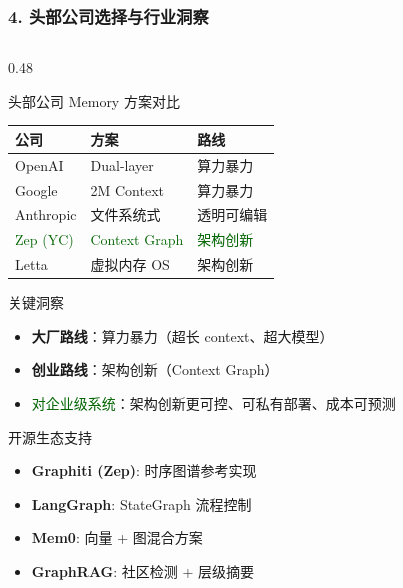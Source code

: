 \documentclass[aspectratio=169,10pt]{beamer}
\begin{document}
\begin{frame}
  \frametitle{4. 头部公司选择与行业洞察}

  \begin{columns}[T]
    \begin{column}{0.48\textwidth}
      \begin{block}{头部公司 Memory 方案对比}
        \scriptsize
        \begin{tabular}{lll}
        \toprule
        \textbf{公司} & \textbf{方案} & \textbf{路线} \\
        \midrule
        OpenAI & Dual-layer & 算力暴力 \\
        Google & 2M Context & 算力暴力 \\
        Anthropic & 文件系统式 & 透明可编辑 \\
        \textcolor{darkgreen}{Zep (YC)} & \textcolor{darkgreen}{Context Graph} & \textcolor{darkgreen}{架构创新} \\
        Letta & 虚拟内存 OS & 架构创新 \\
        \bottomrule
        \end{tabular}
      \end{block}

      \vspace{0.05cm}

      \begin{alertblock}{关键洞察}
        \scriptsize
        \begin{itemize}
          \item \textbf{大厂路线}：算力暴力（超长 context、超大模型）
          \item \textbf{创业路线}：架构创新（Context Graph）
          \item \textcolor{darkgreen}{对企业级系统}：架构创新更可控、可私有部署、成本可预测
        \end{itemize}
      \end{alertblock}

      \vspace{0.05cm}

      \begin{block}{开源生态支持}
        \scriptsize
        \begin{itemize}
          \item \textbf{Graphiti (Zep)}: 时序图谱参考实现
          \item \textbf{LangGraph}: StateGraph 流程控制
          \item \textbf{Mem0}: 向量 + 图混合方案
          \item \textbf{GraphRAG}: 社区检测 + 层级摘要
        \end{itemize}
      \end{block}
    \end{column}


\end{columns}
\end{frame}
\end{document}

